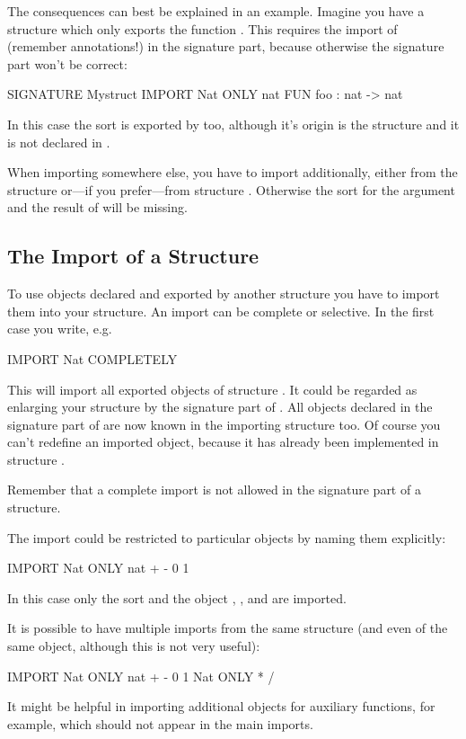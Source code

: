 The consequences can  best be explained in an example.
Imagine you have a structure  which only exports the
function .
This requires the import of  (remember annotations!)
in the signature part, because otherwise the signature part won't be
correct:
\begin{prog}
           SIGNATURE Mystruct
           IMPORT Nat ONLY nat
           FUN foo : nat -> nat
\end{prog}

In this case the sort  is  exported by  too,
although it's origin is the structure  and it is not declared in
.

When importing  somewhere else, you have to import
 additionally, either from the structure 
or---if you prefer---from structure .
Otherwise the sort for the argument and the result of  will be
missing.


\subsection{The Import of a Structure}
\novice
To use objects declared and exported by another structure you have to
import them into your structure. 
An import can be complete or selective.
In the first case you write, e.g.
\begin{prog}
          IMPORT Nat COMPLETELY
\end{prog}
This will import all exported objects of structure . 
It could be regarded as enlarging your structure by the signature part
of .
All objects declared in the signature part of  are now known
in the importing structure too.
Of course you can't redefine an imported object, because it has
already been implemented in  structure .

Remember that a complete import is not allowed in the signature part
of a structure.
\medskip

The import could be restricted to particular objects by naming them
explicitly:
\begin{prog}
          IMPORT Nat ONLY nat + - 0 1
\end{prog}
In this case only the sort  and the object \pro{+},
\pro{-},   and   are imported.

It is possible to have multiple imports from the same structure (and
even of the same object, although this is not very useful):
\begin{prog}
          IMPORT Nat ONLY nat + - 0 1
                 Nat ONLY * /
\end{prog}
It might be helpful in importing  additional objects for auxiliary
functions, for example, which should not appear in the main imports. 

